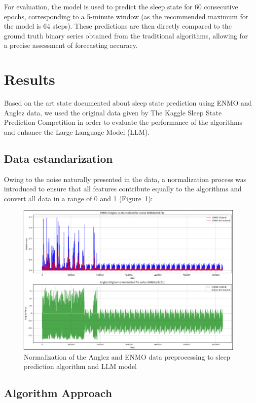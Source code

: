 \documentclass[conference]{IEEEtran}
\begin{document}
For evaluation, the model is used to predict the sleep state for 60 consecutive epochs, corresponding to a 5-minute window (as the recommended maximum for the model is 64 steps). These predictions are then directly compared to the ground truth binary series obtained from the traditional algorithms, allowing for a precise assessment of forecasting accuracy.

\section{Results}

Based on the art state documented about sleep state prediction using ENMO and Anglez data, we used the original 
data given by The Kaggle Sleep State Prediction Competition in order to evaluate the performance of the algorithms
and enhance the Large Language Model (LLM). 

\subsection{Data estandarization}
Owing to the noise naturally presented in the data, a normalization process was introduced to 
ensure that all features contribute equally to the algorithms and convert all
data in a range of 0 and 1 (Figure~\ref{fig:normalization of the Anglez and ENMO}):

\begin{figure}[htbp]
	\centering
	\includegraphics[width=0.85\columnwidth]{data_normalizate.png}
	\caption{Normalization of the Anglez and ENMO data preprocessing to sleep prediction algorithm and LLM model }
	\label{fig:normalization of the Anglez and ENMO}
\end{figure}

\subsection{Algorithm Approach}
\end{document}
